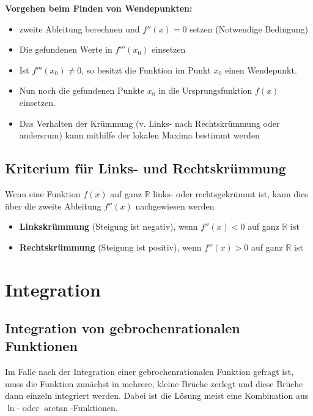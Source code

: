 \documentclass[12pt, a4paper]{scrreprt}
\begin{document}
\begin{framed}
  \textbf{Vorgehen beim Finden von Wendepunkten:}

  \begin{itemize}
  \item zweite Ableitung berechnen und \(f''(x) = 0\) setzen (Notwendige Bedingung)
  \item Die gefundenen Werte in \(f'''(x_0)\) einsetzen
  \item Ist \(f'''(x_0) \neq 0\), so besitzt die Funktion im Punkt \(x_0\) einen Wendepunkt.
  \item Nun noch die gefundenen Punkte \(x_0\) in die Ursprungsfunktion \(f(x)\) einsetzen.
  \item Das Verhalten der Krümmung (v. Links- nach Rechtskrümmung oder andersrum) kann mithilfe der lokalen Maxima bestimmt werden
  \end{itemize}
\end{framed}

\section{Kriterium für Links- und Rechtskrümmung}

Wenn eine Funktion \(f(x)\) auf ganz \(\mathbb{R}\) links- oder rechtsgekrümmt ist, kann dies über die zweite Ableitung \(f''(x)\) nachgewiesen werden

\begin{itemize}
\item \textbf{Linkskrümmung} (Steigung ist negativ), wenn \(f''(x) < 0\) auf ganz \(\mathbb{R}\) ist 
\item \textbf{Rechtskrümmung} (Steigung ist positiv), wenn \(f''(x) > 0\) auf ganz \(\mathbb{R}\) ist 
\end{itemize}

\setcounter{chapter}{8}
\chapter{Integration}

\section{Integration von gebrochenrationalen Funktionen}

Im Falle nach der Integration einer gebrochenrationalen Funktion gefragt ist, muss die Funktion zunächst in mehrere, kleine Brüche zerlegt und diese Brüche dann einzeln integriert werden. Dabei ist die Lösung meist eine Kombination aus \(\ln\)- oder \(\arctan\)-Funktionen.
\end{document}

